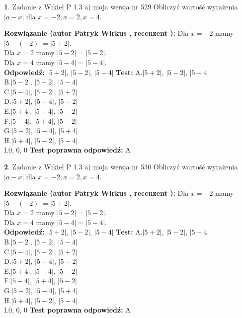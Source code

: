 \documentclass[12pt, a4paper]{article}
\theoremstyle{definition} %
\newtheorem{zad}{}
\newcommand{\zadStart}[1]{\begin{zad}#1\newline}
\newcommand{\zadStop}{\end{zad}}
\newcommand{\rozwStart}[2]{\noindent \textbf{Rozwiązanie (autor #1 , recenzent #2): }\newline}
\newcommand{\rozwStop}{\newline}
\newcommand{\odpStart}{\noindent \textbf{Odpowiedź:}\newline}
\newcommand{\odpStop}{\newline}
\newcommand{\testStart}{\noindent \textbf{Test:}\newline}
\newcommand{\testStop}{\newline}
\newcommand{\kluczStart}{\noindent \textbf{Test poprawna odpowiedź:}\newline}
\newcommand{\kluczStop}{\newline}
\begin{document}
\zadStart{Zadanie z Wikieł P 1.3 a) moja wersja nr 529}
Obliczyć wartość wyrażenia $|a - x|$ dla $x=-2,x=2,x=4$.
\zadStop
\rozwStart{Patryk Wirkus}{}
Dla $x = -2$ mamy $|5 - (-2)| = |5 + 2|$.\\
Dla $x = 2$ mamy $|5 - 2| = |5 - 2|$.\\
Dla $x = 4$ mamy $|5 - 4| = |5 - 4|$.\\
\rozwStop
\odpStart
$|5 + 2|$, $|5 - 2|$, $|5 - 4|$
\odpStop
\testStart
A.$|5 + 2|$, $|5 - 2|$, $|5 - 4|$\\
B.$|5 - 2|$, $|5 + 2|$, $|5 - 4|$\\
C.$|5 - 4|$, $|5 - 2|$, $|5 + 2|$\\
D.$|5 + 2|$, $|5 - 4|$, $|5 - 2|$\\
E.$|5 + 4|$, $|5 - 4|$, $|5 - 2|$\\
F.$|5 - 4|$, $|5 + 4|$, $|5 - 2|$\\
G.$|5 - 2|$, $|5 - 4|$, $|5 + 4|$\\
H.$|5 + 4|$, $|5 - 2|$, $|5 - 4|$\\
I.$0$, $0$, $0$
\testStop
\kluczStart
A
\kluczStop



\zadStart{Zadanie z Wikieł P 1.3 a) moja wersja nr 530}
Obliczyć wartość wyrażenia $|a - x|$ dla $x=-2,x=2,x=4$.
\zadStop
\rozwStart{Patryk Wirkus}{}
Dla $x = -2$ mamy $|5 - (-2)| = |5 + 2|$.\\
Dla $x = 2$ mamy $|5 - 2| = |5 - 2|$.\\
Dla $x = 4$ mamy $|5 - 4| = |5 - 4|$.\\
\rozwStop
\odpStart
$|5 + 2|$, $|5 - 2|$, $|5 - 4|$
\odpStop
\testStart
A.$|5 + 2|$, $|5 - 2|$, $|5 - 4|$\\
B.$|5 - 2|$, $|5 + 2|$, $|5 - 4|$\\
C.$|5 - 4|$, $|5 - 2|$, $|5 + 2|$\\
D.$|5 + 2|$, $|5 - 4|$, $|5 - 2|$\\
E.$|5 + 4|$, $|5 - 4|$, $|5 - 2|$\\
F.$|5 - 4|$, $|5 + 4|$, $|5 - 2|$\\
G.$|5 - 2|$, $|5 - 4|$, $|5 + 4|$\\
H.$|5 + 4|$, $|5 - 2|$, $|5 - 4|$\\
I.$0$, $0$, $0$
\testStop
\kluczStart
A
\kluczStop
\end{document}
